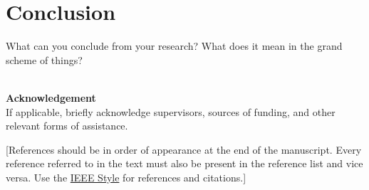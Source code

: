 \documentclass[11pt,a4paper, final, twoside]{article}
\theoremstyle{proposition}
\theoremstyle{definition}
\theoremstyle{remark}
\numberwithin{equation}{section}
\begin{document}
\section{Conclusion}
What can you conclude from your research? What does it mean in the grand scheme of things? 

\mbox{}\\

\noindent \Large\textbf{Acknowledgement}\\[1mm] 

\normalsize \noindent If applicable, briefly acknowledge supervisors, sources of funding, and other relevant forms of assistance.\\[3mm]

\cite{reference-key-a}
\cite{reference-key-b}

[References should be in order of appearance at the end of the manuscript. Every reference referred to in the text must also be present in the reference list and vice versa. Use the \href{http://www.ieee.org/documents/ieeecitationref.pdf}{IEEE Style} for references and citations.]



\end{document}
